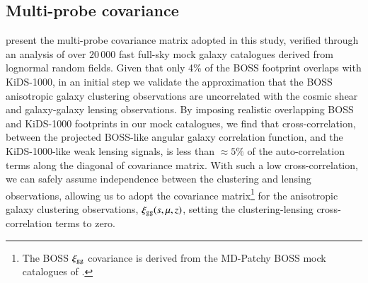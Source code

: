 \subsection{Multi-probe covariance}
\label{sec:Cov}
\citet{joachimi/etal:inprep} present the multi-probe covariance matrix adopted in this study, verified through an analysis of over $20\,000$ fast full-sky mock galaxy catalogues derived from lognormal random fields.   Given that only 4\% of the BOSS footprint overlaps with KiDS-1000, in an initial step we validate the approximation that the BOSS anisotropic galaxy clustering observations are uncorrelated with the cosmic shear and galaxy-galaxy lensing observations.   By imposing realistic overlapping BOSS and KiDS-1000 footprints in our mock catalogues, we find that cross-correlation, between the projected BOSS-like angular galaxy correlation function, and the KiDS-1000-like weak lensing signals, is less than $\approx\!5\%$ of the auto-correlation terms along the diagonal of covariance matrix.  With such a low cross-correlation, we can safely assume independence between the clustering and lensing observations, allowing us to adopt the \citet{sanchez/etal:2017} covariance matrix\footnote{The BOSS $\xi_{\rm gg}$ covariance is derived from the {\sc MD-Patchy} BOSS mock catalogues of \citet{kitaura/etal:2016}.} for the anisotropic galaxy clustering observations, $\xi_{\rm gg}(s,\mu,z)$, setting the clustering-lensing cross-correlation terms to zero.   

